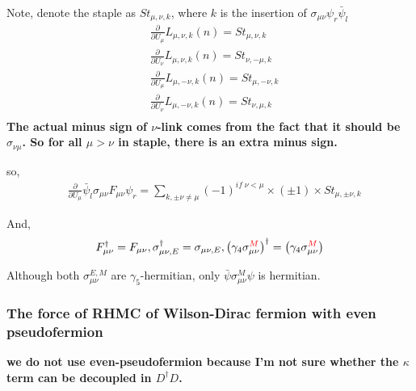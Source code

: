 Note, denote the staple as $St_{\mu,\nu,k}$, where $k$ is the insertion of $\sigma _{\mu\nu}\psi_r \bar{\psi}_l$
\begin{equation}
\begin{split}
&\frac{\partial }{\partial U_{\mu}}L_{\mu,\nu,k}(n) = St_{\mu,\nu,k}\\
&\frac{\partial }{\partial U_{\nu}}L_{\mu,\nu,k}(n) = St_{\nu,-\mu,k}\\
&\frac{\partial }{\partial U_{\mu}}L_{\mu,-\nu,k}(n) = St_{\mu,-\nu,k}\\
&\frac{\partial }{\partial U_{\nu}}L_{\mu,-\nu,k}(n) = St_{\nu,\mu,k}\\
\end{split}
\end{equation}
\textbf{The actual minus sign of $\nu$-link comes from the fact that it should be $\sigma _{\nu\mu}$. So for all $\mu > \nu$ in staple, there is an extra minus sign.}

so, 
\begin{equation}
\begin{split}
&\frac{\partial }{\partial U_{\mu}}\bar{\psi} _l\sigma _{\mu\nu} F_{\mu\nu} \psi _r= \sum _{k,\pm \nu\neq \mu} (-1)^{if\;\nu <\mu} \times (\pm 1)\times St_{\mu,\pm \nu, k}
\end{split}
\end{equation}

And, 
\begin{equation}
\begin{split}
&F_{\mu\nu}^{\dagger}=F_{\mu\nu}, \sigma _{\mu\nu,E}^{\dagger}=\sigma _{\mu\nu,E}, \left(\gamma _4 \sigma _{\mu\nu}^{\textcolor[rgb]{1,0,0}{M}}\right)^{\dagger}=\left(\gamma _4 \sigma _{\mu\nu}^{\textcolor[rgb]{1,0,0}{M}}\right)\\
\end{split}
\end{equation}

\textcolor[rgb]{1,0,0}{Although both $\sigma _{\mu\nu}^{E,M}$ are $\gamma _5$-hermitian, only $\bar{\psi}\sigma _{\mu\nu}^M \psi$ is hermitian.}

\subsubsection{\label{sec:cw.rhmceven}The force of RHMC of Wilson-Dirac fermion with even pseudofermion}

\textbf{we do not use even-pseudofermion because I'm not sure whether the $\kappa$ term can be decoupled in $D^{\dagger}D$.}

